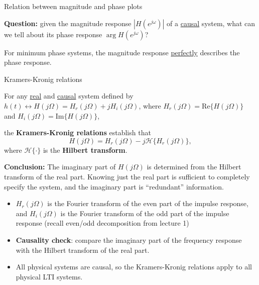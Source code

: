 \documentclass[10pt, aspectratio=169]{beamer}
\begin{document}
\begin{frame}{Relation between magnitude and phase plots}

\textbf{Question:} given the magnitude response $|H(e^{j\omega})|$ of a \underline{causal} system, what can we tell about its phase response $\arg H(e^{j\omega})$?

\vspace{5mm}
\pause
For minimum phase systems, the magnitude response \underline{perfectly} describes the phase response.

\end{frame}

\begin{frame}{Kramers-Kronig relations}

For any \underline{real} and \underline{causal} system defined by $h(t) \leftrightarrow H(j\Omega) = H_r(j\Omega) + jH_i(j\Omega)$, where $H_r(j\Omega) = \mathrm{Re}\{H(j\Omega)\}$ and $H_i(j\Omega) = \mathrm{Im}\{H(j\Omega)\}$,

the \textbf{Kramers-Kronig relations} establish that
\begin{equation*}
H(j\Omega) = H_r(j\Omega) - j\mathcal{H}\{H_r(j\Omega)\},
\end{equation*}
where $\mathcal{H}\{\cdot\}$ is the \textbf{Hilbert transform}.

\pause
\textbf{Conclusion:} The imaginary part of $H(j\Omega)$ is determined from the Hilbert transform of the real part. Knowing just the real part is sufficient to completely specify the system, and the imaginary part is ``redundant'' information.

\pause
\begin{itemize}
	\item $H_r(j\Omega)$ is the Fourier transform of the even part of the impulse response, and  $H_i(j\Omega)$ is the Fourier transform of the odd part of the impulse response (recall even/odd decomposition from lecture 1)
	\item \textbf{Causality check}: compare the imaginary part of the frequency response with the Hilbert transform of the real part.
	\item All physical systems are causal, so the Kramers-Kronig relations apply to all physical LTI systems.
\end{itemize}
\end{frame}
\end{document}
